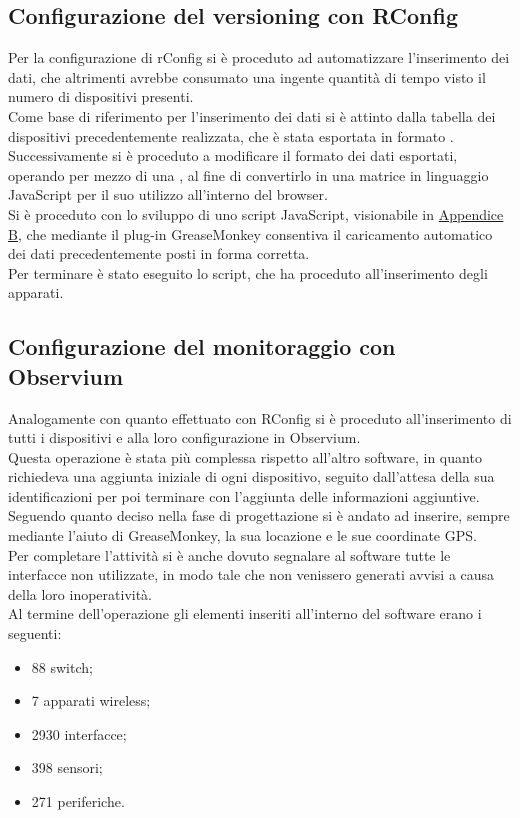 \documentclass[Realizzazione.tex]{subfiles}
\begin{document}
\subsection{Configurazione del versioning con RConfig}
Per la configurazione di rConfig si è proceduto ad automatizzare l'inserimento dei dati, che altrimenti avrebbe consumato una ingente quantità di tempo visto il numero di dispositivi presenti. \\
Come base di riferimento per l'inserimento dei dati si è attinto dalla tabella dei dispositivi 
precedentemente realizzata, che è stata esportata in formato .\\
Successivamente si è proceduto a modificare il formato dei dati esportati, operando per mezzo di una , al fine di convertirlo in una matrice in linguaggio JavaScript per il suo utilizzo all'interno del browser. \\
Si è proceduto con lo sviluppo di uno script JavaScript, visionabile in \hyperref[sec:Appendice B]{Appendice B}, che mediante il plug-in GreaseMonkey consentiva il caricamento automatico dei dati precedentemente posti in forma corretta. \\
Per terminare è stato eseguito lo script, che ha proceduto all'inserimento degli apparati. \\

\subsection{Configurazione del monitoraggio con Observium}
Analogamente con quanto effettuato con RConfig si è proceduto all'inserimento di tutti i dispositivi e alla loro configurazione in Observium. \\
Questa operazione è stata più complessa rispetto all'altro software, in quanto richiedeva una aggiunta iniziale di ogni dispositivo, seguito dall'attesa della sua identificazioni per poi terminare con l'aggiunta delle informazioni aggiuntive. Seguendo quanto deciso nella fase di progettazione si è andato ad inserire, sempre mediante l'aiuto di GreaseMonkey, la sua locazione e le sue coordinate GPS. \\
Per completare l'attività si è anche dovuto segnalare al software tutte le interfacce non utilizzate, in modo tale che non venissero generati avvisi a causa della loro inoperatività.\\

Al termine dell'operazione gli elementi inseriti all'interno del software erano i seguenti:
\begin{itemize}
	\item 88 switch;
	\item 7 apparati wireless;
	\item 2930 interfacce;
	\item 398 sensori;
	\item 271 periferiche.
\end{itemize}
\end{document}

